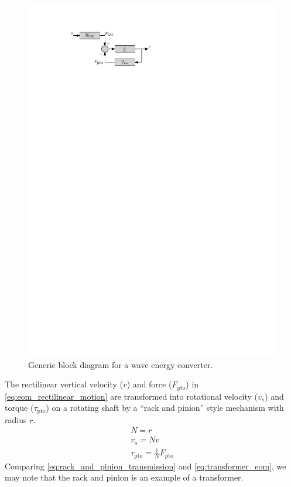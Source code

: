 \documentclass[lettersize,journal]{IEEEtran}
\begin{document}
\begin{figure}[tb]
        \centering
        \includegraphics[width=0.8\columnwidth]{wec_as_multiport_block_diagram.pdf}
        \caption{Generic block diagram for a wave energy converter.}
        \label{fig:wec_as_multiport_block_diagram}
\end{figure}

The rectilinear vertical velocity ($v$) and force ($F_{\textrm{pto}}$) in \eqref{eq:eom_rectilinear_motion} are transformed into rotational velocity ($v_s$) and torque ($\tau_{\textrm{pto}}$) on a rotating shaft by a ``rack and pinion'' style mechanism with radius $r$.
%
\begin{subequations}
        \begin{gather}
                N = r \\
                v_s = N v \\
                \tau_{\textrm{pto}} = \frac{1}{N} F_{\textrm{pto}}
        \end{gather}
        \label{eq:rack_and_pinion_transmission}%
\end{subequations}
%
Comparing \eqref{eq:rack_and_pinion_transmission} and \eqref{eq:transformer_eom}, we may note that the rack and pinion is an example of a transformer.
\end{document}
